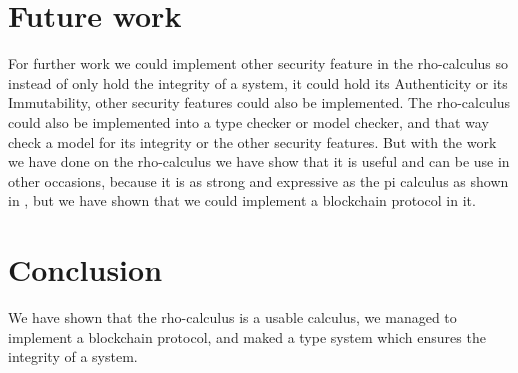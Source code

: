 \section{Future work}
For further work we could implement other security feature in the rho-calculus so instead of only hold the integrity of a system, it could hold its Authenticity or its Immutability, other security features could also be implemented. The rho-calculus could also be implemented into a type checker or model checker, and that way check a model for its integrity or the other security features. But with the work we have done on the rho-calculus we have show that it is useful and can be use in other occasions, because it is as strong and expressive as the pi calculus as shown in \citep{Meredith2005}, but we have shown that we could implement a blockchain protocol in it.



\section{Conclusion}
We have shown that the rho-calculus is a usable calculus, we managed to implement a blockchain protocol, and maked a type system which ensures the integrity of a system.